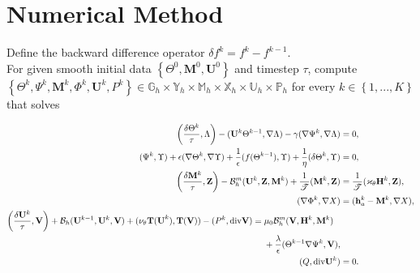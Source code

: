 \documentclass[9pt]{beamer}
\newcommand{\set}[1]{\left\{#1\right\}}
\newcommand{\grad}{\nabla}
\newcommand{\diverg}{\textup{div} }
\newcommand{\eps}{\epsilon}
\begin{document}
\section{Numerical Method}
\begin{frame}
	Define the backward difference operator $\delta f^k = f^k - f^{k-1}$.\\
	\vspace{.1in}
	For given smooth initial data $\set{\Theta^0, \mathbf{M}^0,\mathbf{U}^0}$ and timestep $\tau$, compute $\set{\Theta^k, \Psi^k, \mathbf{M}^k, \Phi^k, \mathbf{U}^k, {P}^k}\in \mathbb{G}_h\times \mathbb{Y}_h\times \mathbb{M}_h\times\mathbb{X}_h\times\mathbb{U}_h\times\mathbb{P}_h$ for every $k\in\set{1,...,K}$ that solves
	
	\footnotesize\begin{subequations}\label{NumScheme}
		\begin{align}
		\label{NumScheme:1}\bigg(\frac{\delta\Theta^k}{\tau}, \Lambda\bigg) - (\mathbf{U}^k\Theta^{k-1}, \grad\Lambda) - \gamma(\grad \Psi^k, \grad \Lambda)&=0,\\
		\label{NumScheme:2}(\Psi^k, \Upsilon) + \eps(\grad \Theta^k, \grad \Upsilon) + \frac{1}{\eps}(f(\Theta^{k-1}), \Upsilon) + \frac{1}{\eta}(\delta\Theta^k, \Upsilon) &= 0,\\
		\label{NumScheme:3}\bigg(\frac{\delta\mathbf{M}^k}{\tau}, \mathbf{Z}\bigg) - \mathcal{B}_h^m(\mathbf{U}^k, \mathbf{Z}, \mathbf{M}^k) + \frac{1}{\mathscr{T}}(\mathbf{M}^k, \mathbf{Z}) &= \frac{1}{\mathscr{T}}(\varkappa_\theta\mathbf{H}^k, \mathbf{Z}),\\
		\label{NumScheme:4}(\grad\Phi^k, \grad X) &= (\mathbf{h}_a^k - \mathbf{M}^k, \grad X),\\
		\begin{split}
		\label{NumScheme:5}\bigg(\frac{\delta\mathbf{U}^k}{\tau}, \mathbf{V}\bigg) + \mathcal{B}_h(\mathbf{U}^{k-1}, \mathbf{U}^k, \mathbf{V}) + (\nu_\theta\mathbf{T(U}^k), \mathbf{T(V)}) - (P^k, \diverg \mathbf{V}) &= \mu_0\mathcal{B}_h^m(\mathbf{V}, \mathbf{H}^k, \mathbf{M}^k)\\
		&\phantom{{}={}}+\frac{\lambda}{\eps}(\Theta^{k-1}\grad \Psi^k, \mathbf{V}),
		\end{split}\\
		\label{NumScheme:6}(Q, \diverg\mathbf{U}^k) &= 0.
		\end{align}
	\end{subequations}
	\normalsize
\end{frame}
\end{document}
